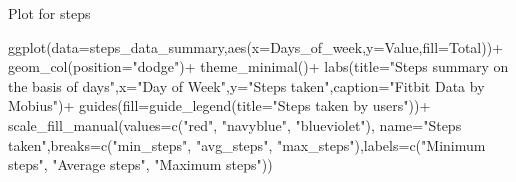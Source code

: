 \documentclass[
]{article}
\newenvironment{Shaded}{\begin{snugshade}}{\end{snugshade}}
\newcommand{\AttributeTok}[1]{\textcolor[rgb]{0.77,0.63,0.00}{#1}}
\newcommand{\FunctionTok}[1]{\textcolor[rgb]{0.00,0.00,0.00}{#1}}
\newcommand{\NormalTok}[1]{#1}
\newcommand{\OtherTok}[1]{\textcolor[rgb]{0.56,0.35,0.01}{#1}}
\newcommand{\SpecialCharTok}[1]{\textcolor[rgb]{0.00,0.00,0.00}{#1}}
\newcommand{\StringTok}[1]{\textcolor[rgb]{0.31,0.60,0.02}{#1}}
\begin{document}
\begin{Shaded}
\end{Shaded}

Plot for steps

\begin{Shaded}
\begin{Highlighting}[]
\FunctionTok{ggplot}\NormalTok{(}\AttributeTok{data=}\NormalTok{steps\_data\_summary,}\FunctionTok{aes}\NormalTok{(}\AttributeTok{x=}\NormalTok{Days\_of\_week,}\AttributeTok{y=}\NormalTok{Value,}\AttributeTok{fill=}\NormalTok{Total))}\SpecialCharTok{+}
  \FunctionTok{geom\_col}\NormalTok{(}\AttributeTok{position=}\StringTok{"dodge"}\NormalTok{)}\SpecialCharTok{+}
  \FunctionTok{theme\_minimal}\NormalTok{()}\SpecialCharTok{+}
  \FunctionTok{labs}\NormalTok{(}\AttributeTok{title=}\StringTok{"Steps summary on the basis of days"}\NormalTok{,}\AttributeTok{x=}\StringTok{"Day of Week"}\NormalTok{,}\AttributeTok{y=}\StringTok{"Steps taken"}\NormalTok{,}\AttributeTok{caption=}\StringTok{"Fitbit Data by Mobius"}\NormalTok{)}\SpecialCharTok{+}
  \FunctionTok{guides}\NormalTok{(}\AttributeTok{fill=}\FunctionTok{guide\_legend}\NormalTok{(}\AttributeTok{title=}\StringTok{"Steps taken by users"}\NormalTok{))}\SpecialCharTok{+}
  \FunctionTok{scale\_fill\_manual}\NormalTok{(}\AttributeTok{values=}\FunctionTok{c}\NormalTok{(}\StringTok{"red"}\NormalTok{, }\StringTok{"navyblue"}\NormalTok{, }\StringTok{"blueviolet"}\NormalTok{), }\AttributeTok{name=}\StringTok{"Steps taken"}\NormalTok{,}\AttributeTok{breaks=}\FunctionTok{c}\NormalTok{(}\StringTok{"min\_steps"}\NormalTok{, }\StringTok{"avg\_steps"}\NormalTok{, }\StringTok{"max\_steps"}\NormalTok{),}\AttributeTok{labels=}\FunctionTok{c}\NormalTok{(}\StringTok{"Minimum steps"}\NormalTok{, }\StringTok{"Average steps"}\NormalTok{, }\StringTok{"Maximum steps"}\NormalTok{))}
\end{Highlighting}
\end{Shaded}
\end{document}
